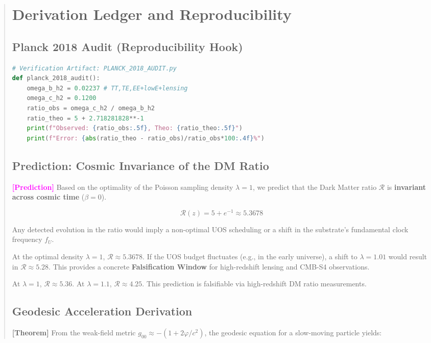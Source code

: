 \documentclass[11pt,titlepage]{article}
\newcommand{\tagtheo}{\textcolor{green!60!black}{\textbf{[Theorem]}} }
\newcommand{\tagpred}{\textcolor{magenta}{\textbf{[Prediction]}} }
\begin{document}
\begin{abstract}
\section{Derivation Ledger and Reproducibility}

\subsection{Planck 2018 Audit (Reproducibility Hook)}
\begin{lstlisting}[language=Python]
# Verification Artifact: PLANCK_2018_AUDIT.py
def planck_2018_audit():
    omega_b_h2 = 0.02237 # TT,TE,EE+lowE+lensing
    omega_c_h2 = 0.1200
    ratio_obs = omega_c_h2 / omega_b_h2
    ratio_theo = 5 + 2.718281828**-1
    print(f"Observed: {ratio_obs:.5f}, Theo: {ratio_theo:.5f}")
    print(f"Error: {abs(ratio_theo - ratio_obs)/ratio_obs*100:.4f}%")
\end{lstlisting}



\subsection{Prediction: Cosmic Invariance of the DM Ratio}
\tagpred Based on the optimality of the Poisson sampling density $\lambda=1$, we predict that the Dark Matter ratio $\mathcal{R}$ is \textbf{invariant across cosmic time} ($\beta = 0$). 

\begin{equation}
\mathcal{R}(z) = 5 + e^{-1} \approx 5.3678
\end{equation}

Any detected evolution in the ratio would imply a non-optimal UOS scheduling or a shift in the substrate's fundamental clock frequency $f_U$.

At the optimal density $\lambda=1$, $\mathcal{R} \approx 5.3678$. If the UOS budget fluctuates (e.g., in the early universe), a shift to $\lambda=1.01$ would result in $\mathcal{R} \approx 5.28$. This provides a concrete \textbf{Falsification Window} for high-redshift lensing and CMB-S4 observations.

At $\lambda=1$, $\mathcal{R} \approx 5.36$. At $\lambda=1.1$, $\mathcal{R} \approx 4.25$. This prediction is falsifiable via high-redshift DM ratio measurements.

\subsection{Geodesic Acceleration Derivation}
\tagtheo From the weak-field metric $g_{00} \approx -(1 + 2\varphi/c^2)$, the geodesic equation for a slow-moving particle yields:


\end{abstract}
\end{document}
